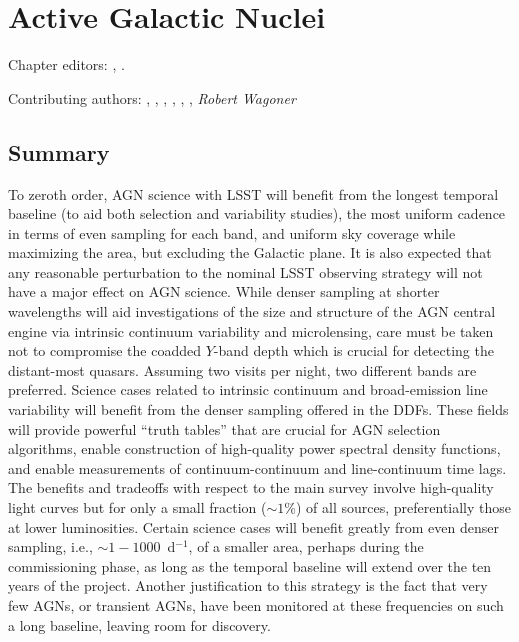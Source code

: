 
\chapter[AGN]{Active Galactic Nuclei}
\def\chpname{agn}\label{chp:\chpname}

Chapter editors:
,
.

Contributing authors:
,
,
,
,
,
,
{\it Robert Wagoner}

\section*{Summary}

To zeroth order, AGN science with LSST will benefit from the
longest temporal baseline (to aid both selection and variability studies), the most
uniform cadence in terms of even sampling for each band, and uniform sky
coverage while maximizing the area, but excluding the Galactic plane. It
is also expected that any reasonable perturbation to the nominal LSST
observing strategy will not have a major effect on AGN science. While
denser sampling at shorter wavelengths will aid investigations of the
size and structure of the AGN central engine via intrinsic continuum
variability and microlensing, care must be taken not to compromise the
coadded $Y$-band depth which is crucial for detecting the distant-most
quasars. Assuming two visits per night, two different bands are
preferred. Science cases related to intrinsic continuum and
broad-emission line variability will benefit from the denser sampling
offered in the DDFs. These fields will provide powerful ``truth tables''
that are crucial for AGN selection algorithms, enable construction of
high-quality power spectral density functions, and enable measurements
of continuum-continuum and line-continuum time lags. The benefits and
tradeoffs with respect to the main survey involve high-quality light
curves but for only a small fraction ($\sim1$\%) of all sources,
preferentially those at lower luminosities. Certain science cases will
benefit greatly from even denser sampling, i.e., $\sim1 -
1000$~d$^{-1}$, of a smaller area, perhaps during the commissioning
phase, as long as the temporal baseline will extend over the ten years
of the project. Another justification to this strategy is the fact that
very few AGNs, or transient AGNs, have been monitored at these
frequencies on such a long baseline, leaving room for discovery.

